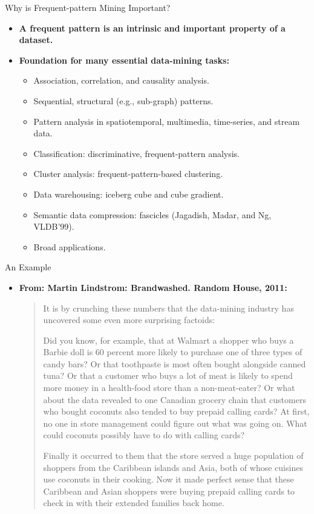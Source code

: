 \begin{frame}{Why is Frequent-pattern Mining Important?}
	\begin{itemize}
		\item \textbf{A frequent pattern is an intrinsic and important property 
		of a dataset.}
		\item \textbf{Foundation for many essential data-mining tasks:}
		\begin{itemize}
			\item Association, correlation, and causality analysis.
			\item Sequential, structural (e.g., sub-graph) patterns.
			\item Pattern analysis in spatiotemporal, multimedia, time-series, 
			and stream data.
			\item Classification: discriminative, frequent-pattern analysis.
			\item Cluster analysis: frequent-pattern-based clustering.
			\item Data warehousing: iceberg cube and cube gradient.
			\item Semantic data compression: fascicles (Jagadish, Madar, and 
			Ng, VLDB'99).
			\item Broad applications.
		\end{itemize}
	\end{itemize}
\end{frame}

\begin{frame}{An Example}
	\begin{itemize}
		\item \textbf{From: Martin Lindstrom: Brandwashed. Random House, 2011:}
		\begin{quote}
			It is by crunching these numbers that the data-mining industry has 
			uncovered some even more surprising factoids:
			
			Did you know, for example, that at Walmart a shopper who buys a 
			Barbie doll is 60 percent more likely to purchase one of three 
			types of candy bars? Or that toothpaste is most often bought 
			alongside canned tuna? Or that a customer who buys a lot of meat is 
			likely to spend more money in a health-food store than a 
			non-meat-eater? Or what about the data revealed to one Canadian 
			grocery chain that customers who bought coconuts also tended to buy 
			prepaid calling cards? At first, no one in store management could 
			figure out what was going on. What could coconuts possibly have to 
			do with calling cards?
			
			Finally it occurred to them that the store served a huge population 
			of shoppers from the Caribbean islands and Asia, both of whose 
			cuisines use coconuts in their cooking. Now it made perfect sense 
			that these Caribbean and Asian shoppers were buying prepaid calling 
			cards to check in with their extended families back home.
		\end{quote}
	\end{itemize}
\end{frame}

